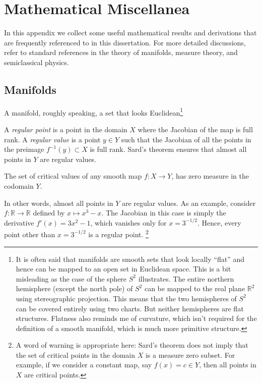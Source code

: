 
\chapter{Mathematical Miscellanea}
\label{app:math}

In this appendix we collect some useful mathematical results and derivations that are frequently referenced to in this dissertation.
For more detailed discussions, refer to standard references in the theory of manifolds, measure theory, and semiclassical physics.

\section{Manifolds}

A manifold, roughly speaking, a set that looks Euclidean\footnote{It is often said that manifolds are smooth sets that look locally ``flat'' and hence can be mapped to an open set in Euclidean space.
This is a bit misleading as the case of the sphere $S^2$ illustrates.
The entire northern hemisphere (except the north pole) of $S^2$ can be mapped to the real plane $\mathbb{R}^{2}$ using stereographic projection.
This means that the two hemispheres of $S^2$ can be covered entirely using two charts.
But neither hemispheres are flat structures.
Flatness also reminds me of curvature, which isn't required for the definition of a smooth manifold, which is much more primitive structure.}

A \emph{regular point} is a point in the domain $X$ where the Jacobian of the map is full rank.
A \emph{regular value} is a point $y \in Y$ such that the Jacobian of all the points in the preimage $f^{-1}(y) \subset X$ is full rank.
Sard's theorem ensures that almost all points in $Y$ are regular values.
%
\begin{theorem}
  The set of critical values of any smooth map $f: X \to Y$, has zero measure in the codomain $Y$.
\end{theorem}

In other words, almost all points in $Y$ are regular values.
As an example, consider $f: \mathbb{R} \to \mathbb{R}$ defined by $x \mapsto x^3 - x$.
The Jacobian in this case is simply the derivative $f'(x) = 3x^2 - 1$, which vanishes only for $x = 3^{-1/2}$.
Hence, every point other than $x = 3^{-1/2}$ is a regular point.%
\footnote{A word of warning is appropriate here: Sard's theorem does not imply that the set of critical points in the domain $X$ is a measure zero subset.
For example, if we consider a constant map, say $f(x) = c \in Y$, then all points in $X$ are critical points.}

